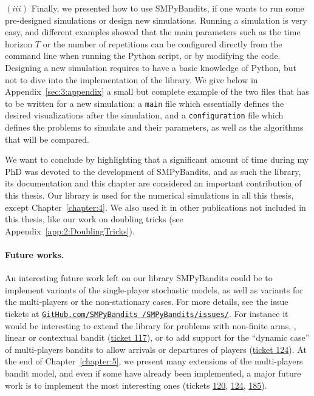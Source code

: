 $(iii)$
Finally, we presented how to use SMPyBandits, if one wants to run some pre-designed simulations or design new simulations.
Running a simulation is very easy, and different examples showed that the main parameters such as the time horizon $T$ or the number of repetitions can be configured directly from the command line when running the Python script, or by modifying the code.
Designing a new simulation requires to have a basic knowledge of Python, but not to dive into the implementation of the library.
We give below in Appendix~\ref{sec:3:appendix} a small but complete example of the two files that has to be written for a new simulation: a \texttt{main} file which essentially defines the desired visualizations after the simulation, and a \texttt{configuration} file which defines the problems to simulate and their parameters, as well as the algorithms that will be compared.


We want to conclude by highlighting that a significant amount of time during my PhD was devoted to the development of SMPyBandits, and as such the library, its documentation and this chapter  are considered an important contribution of this thesis.
%
Our library is used for the numerical simulations in all this thesis, except Chapter~\ref{chapter:4}.
We also used it in other publications not included in this thesis, like our work on doubling tricks \cite{Besson2018DoublingTricks} (see Appendix~\ref{app:2:DoublingTricks}).


\paragraph{Future works.}
%
An interesting future work left on our library SMPyBandits could be to implement variants of the single-player stochastic models, as well as variants for the multi-players or the non-stationary cases.
For more details, see the issue tickets at \href{https://github.com/SMPyBandits/SMPyBandits/issues/}{\texttt{GitHub.com/SMPyBandits /SMPyBandits/issues/}}.
For instance it would be interesting to extend the library for problems with non-finite arms, \eg, linear or contextual bandit (\href{https://github.com/SMPyBandits/SMPyBandits/issues/117}{ticket 117}),
or to add support for the ``dynamic case'' of multi-players bandits to allow arrivals or departures of players (\href{https://github.com/SMPyBandits/SMPyBandits/issues/124}{ticket 124}).
%
At the end of Chapter~\ref{chapter:5}, we present many extensions of the multi-players bandit model,
and even if some have already been implemented, a major future work is to implement the most interesting ones
(tickets \href{https://github.com/SMPyBandits/SMPyBandits/issues/120}{120}, \href{https://github.com/SMPyBandits/SMPyBandits/issues/124}{124}, \href{https://github.com/SMPyBandits/SMPyBandits/issues/185}{185}).

